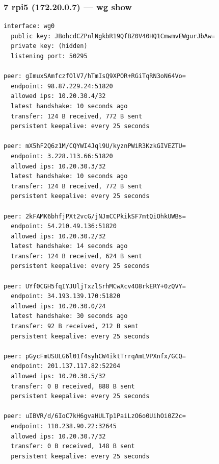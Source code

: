 \documentclass[11pt,a4paper]{article}
\begin{document}
\subsubsection*{7 rpi5 (172.20.0.7) — wg show}
\begin{lstlisting}
interface: wg0
  public key: JBohcdCZPnlNgkbR19QfBZ0V40HQ1CmwmvEWgurJbAw=
  private key: (hidden)
  listening port: 50295

peer: gImuxSAmfczfOlV7/hTmIsQ9XPOR+RGiTqRN3oN64Vo=
  endpoint: 98.87.229.24:51820
  allowed ips: 10.20.30.4/32
  latest handshake: 10 seconds ago
  transfer: 124 B received, 772 B sent
  persistent keepalive: every 25 seconds

peer: mX5hF2Q6z1M/CQYWI4Jql9U/kyznPWiR3KzkGIVEZTU=
  endpoint: 3.228.113.66:51820
  allowed ips: 10.20.30.3/32
  latest handshake: 10 seconds ago
  transfer: 124 B received, 772 B sent
  persistent keepalive: every 25 seconds

peer: 2kFAMK6bhfjPXt2vcG/jNJmCCPkikSF7mtQiOhkUWBs=
  endpoint: 54.210.49.136:51820
  allowed ips: 10.20.30.2/32
  latest handshake: 14 seconds ago
  transfer: 124 B received, 624 B sent
  persistent keepalive: every 25 seconds

peer: UYf0CGH5fqIYJUljTxzlSrhMCwXcv4O8rkERY+0zQVY=
  endpoint: 34.193.139.170:51820
  allowed ips: 10.20.30.0/24
  latest handshake: 30 seconds ago
  transfer: 92 B received, 212 B sent
  persistent keepalive: every 25 seconds

peer: pGycFmUSULG6l01f4syhCW4iktTrrqAmLVPXnfx/GCQ=
  endpoint: 201.137.117.82:52204
  allowed ips: 10.20.30.5/32
  transfer: 0 B received, 888 B sent
  persistent keepalive: every 25 seconds

peer: uIBVR/d/6IoC7kH6gvaHULTp1PaiLzO6o0UihOi0Z2c=
  endpoint: 110.238.90.22:32645
  allowed ips: 10.20.30.7/32
  transfer: 0 B received, 148 B sent
  persistent keepalive: every 25 seconds

\end{lstlisting}
\end{document}
